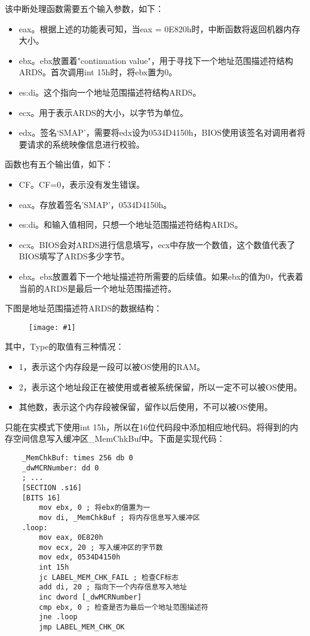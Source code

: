\documentclass[a4paper,left=2.5cm,right=2.5cm,11pt]{article}
\newcommand{\fic}[1]{\begin{figure}[H]
		\center
		\texttt{[image: \#1]}
	\end{figure}}
\begin{document}
	该中断处理函数需要五个输入参数，如下：
	\begin{itemize}
		\item eax。根据上述的功能表可知，当eax = 0E820h时，中断函数将返回机器内存大小。
		\item ebx。ebx放置着"continuation value"，用于寻找下一个地址范围描述符结构ARDS。首次调用int 15h时，将ebx置为0。
		\item es:di。这个指向一个地址范围描述符结构ARDS。
		\item ecx。用于表示ARDS的大小，以字节为单位。
		\item edx。签名‘SMAP’，需要将edx设为0534D4150h，BIOS使用该签名对调用者将要请求的系统映像信息进行校验。
	\end{itemize}

	函数也有五个输出值，如下：
	\begin{itemize}
		\item CF。CF=0，表示没有发生错误。
		\item eax。存放着签名'SMAP'，0534D4150h。
		\item es:di。和输入值相同，只想一个地址范围描述符结构ARDS。
		\item ecx。BIOS会对ARDS进行信息填写，ecx中存放一个数值，这个数值代表了BIOS填写了ARDS多少字节。
		\item ebx。ebx放置着下一个地址描述符所需要的后续值。如果ebx的值为0，代表着当前的ARDS是最后一个地址范围描述符。
	\end{itemize}

	下图是地址范围描述符ARDS的数据结构：
	\fic{7.png}

	其中，Type的取值有三种情况：
	\begin{itemize}
		\item 1，表示这个内存段是一段可以被OS使用的RAM。
		\item 2，表示这个地址段正在被使用或者被系统保留，所以一定不可以被OS使用。
		\item 其他数，表示这个内存段被保留，留作以后使用，不可以被OS使用。
	\end{itemize}

	只能在实模式下使用int 15h，所以在16位代码段中添加相应地代码。将得到的内存空间信息写入缓冲区\_MemChkBuf中。下面是实现代码：
	\begin{lstlisting}
	_MemChkBuf: times 256 db 0
	_dwMCRNumber: dd 0
	; ...
	[SECTION .s16]
	[BITS 16]
		mov ebx, 0 ; 将ebx的值置为一
		mov di, _MemChkBuf ; 将内存信息写入缓冲区
	.loop:
		mov eax, 0E820h
		mov ecx, 20 ; 写入缓冲区的字节数
		mov edx, 0534D4150h
		int 15h
		jc LABEL_MEM_CHK_FAIL ; 检查CF标志
		add di, 20 ; 指向下一个内存信息写入地址
		inc dword [_dwMCRNumber]
		cmp ebx, 0 ; 检查是否为最后一个地址范围描述符
		jne .loop
		jmp LABEL_MEM_CHK_OK
	\end{lstlisting}
\end{document}
